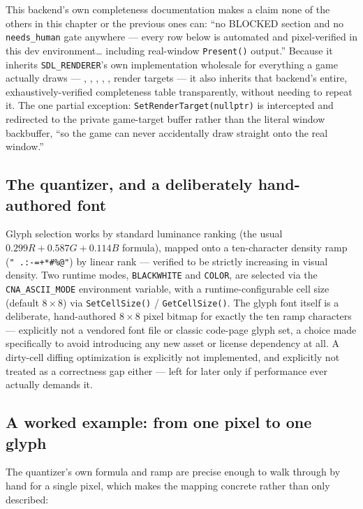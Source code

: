 This backend's own completeness documentation makes a claim none of the others in this
chapter or the previous ones can: ``no BLOCKED section and no \texttt{needs\_human} gate
anywhere --- every row below is automated and pixel-verified in this dev environment\ldots
including real-window \texttt{Present()} output.'' Because it inherits \texttt{SDL\_RENDERER}'s
own implementation wholesale for everything a game actually draws --- ,
, , , ,
render targets --- it also inherits that backend's entire, exhaustively-verified completeness
table transparently, without needing to repeat it. The one partial exception:
\texttt{SetRenderTarget(nullptr)} is intercepted and redirected to the private game-target
buffer rather than the literal window backbuffer, ``so the game can never accidentally draw
straight onto the real window.''

\subsection{The quantizer, and a deliberately hand-authored font}

Glyph selection works by standard luminance ranking (the usual $0.299R + 0.587G + 0.114B$
formula), mapped onto a ten-character density ramp (\texttt{" .:-=+*\#\%@"}) by linear rank ---
verified to be strictly increasing in visual density. Two runtime modes,
\texttt{BLACKWHITE} and \texttt{COLOR}, are selected via the \texttt{CNA\_ASCII\_MODE}
environment variable, with a runtime-configurable cell size (default $8\times8$) via
\texttt{SetCellSize()} / \texttt{GetCellSize()}. The glyph font itself is a deliberate,
hand-authored $8\times8$ pixel bitmap for exactly the ten ramp characters --- explicitly not
a vendored font file or classic code-page glyph set, a choice made specifically to avoid
introducing any new asset or license dependency at all. A dirty-cell diffing optimization is
explicitly not implemented, and explicitly not treated as a correctness gap either --- left
for later only if performance ever actually demands it.

\subsection{A worked example: from one pixel to one glyph}

The quantizer's own formula and ramp are precise enough to walk through by hand for a single
pixel, which makes the mapping concrete rather than only described:

